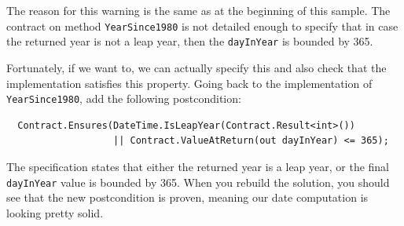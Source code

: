 \documentclass{article}
\newcommand{\code}[1]{\lstinline{#1}}
\begin{document}
The reason for this warning is the same as at the beginning of this
sample. The contract on method \code{YearSince1980} is not detailed
enough to specify that in case the returned year is not a leap year,
then the \code{dayInYear} is bounded by 365.

Fortunately, if we want to, we can actually specify this and also
check that the implementation satisfies this property. Going back to
the implementation of \code{YearSince1980}, add the following
postcondition:
\begin{lstlisting}
  Contract.Ensures(DateTime.IsLeapYear(Contract.Result<int>())
                   || Contract.ValueAtReturn(out dayInYear) <= 365);
\end{lstlisting}
The specification states that either the returned year is a leap year,
or the final \code{dayInYear} value is bounded by 365. When you
rebuild the solution, you should see that the new postcondition is
proven, meaning our date computation is looking pretty solid.
\end{document}
